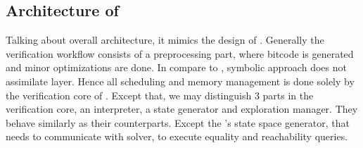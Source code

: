 
\subsection{Architecture of \SymDIVINE}
Talking about \SymDIVINE overall architecture, it mimics the design of \DIVINE.
Generally the verification workflow consists of a preprocessing part, where
\LLVM bitcode is generated and minor optimizations are done. In compare to
\DIVINE, symbolic approach does not assimilate \DIOS layer. Hence all scheduling
and memory management is done solely by the verification core of \SymDIVINE. Except
that, we may distinguish 3 parts in the verification core, an interpreter, a state
generator and exploration manager. They behave similarly as their \DIVINE
counterparts. Except the \SymDIVINE's state space generator, that needs to
communicate with \SMT solver, to execute equality and reachability queries.

